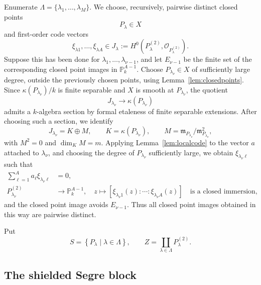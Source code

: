 \documentclass{lms}
\newcommand{\PP}{\mathbb P}
\newcommand{\OO}{\mathcal O}
\newcommand{\kk}{\kappa}
\newcommand{\mm}{\mathfrak m}
\newcommand{\set}[1]{\left\{#1\right\}}
\begin{document}
Enumerate $\Lambda=\{\lambda_1,\ldots,\lambda_M\}$.  We choose, recursively, pairwise distinct closed points
\[
        P_\lambda\in X
\]
and first-order code vectors
\[
        \xi_{\lambda1},\ldots,\xi_{\lambda A}
        \in J_\lambda:=H^0(P_\lambda^{(2)},\OO_{P_\lambda^{(2)}}).
\]
Suppose this has been done for $\lambda_1,\ldots,\lambda_{\nu-1}$, and let $E_{\nu-1}$ be the finite set of the corresponding closed point images in $\PP^{A-1}_k$.  Choose $P_{\lambda_\nu}\in X$ of sufficiently large degree, outside the previously chosen points, using Lemma~\ref{lem:closedpoints}.  Since $\kk(P_{\lambda_\nu})/k$ is finite separable and $X$ is smooth at $P_{\lambda_\nu}$, the quotient
\[
        J_{\lambda_\nu}\longrightarrow \kk(P_{\lambda_\nu})
\]
admits a $k$-algebra section by formal etaleness of finite separable extensions.  After choosing such a section, we identify
\[
        J_{\lambda_\nu}=K\oplus M,
        \qquad
        K=\kk(P_{\lambda_\nu}),
        \qquad
        M=\mm_{P_{\lambda_\nu}}/\mm_{P_{\lambda_\nu}}^2,
\]
with $M^2=0$ and $\dim_KM=m$.  Applying Lemma~\ref{lem:localcode} to the vector $a$ attached to $\lambda_\nu$, and choosing the degree of $P_{\lambda_\nu}$ sufficiently large, we obtain $\xi_{\lambda_\nu\ell}$ such that
\begin{align}
        \sum_{\ell=1}^{A}a_\ell\xi_{\lambda_\nu\ell}&=0,
        \label{eq:xi-relation}\\
        P_{\lambda_\nu}^{(2)}&\longrightarrow\PP^{A-1}_k,
        \quad z\longmapsto[\xi_{\lambda_\nu1}(z):\cdots:\xi_{\lambda_\nu A}(z)]
        \quad\text{is a closed immersion,}                     \label{eq:xi-immersion}
\end{align}
and the closed point image avoids $E_{\nu-1}$.  Thus all closed point images obtained in this way are pairwise distinct.

Put
\[
        S=\set{P_\lambda\mid\lambda\in\Lambda},
        \qquad
        Z=\coprod_{\lambda\in\Lambda}P_\lambda^{(2)}.
\]

\subsection{The shielded Segre block}
\end{document}
